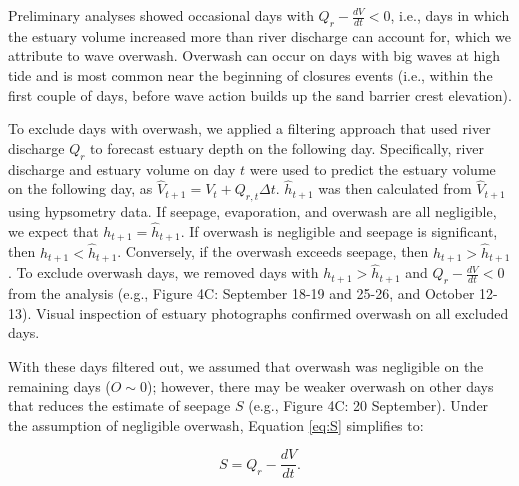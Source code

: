 \documentclass[preprint,12pt,authoryear]{elsarticle}
\begin{document}
Preliminary analyses showed occasional days with  $Q_r - \frac{dV}{ dt} <0$, i.e., days in which the estuary volume increased more than river discharge can account for, which we attribute to wave overwash. Overwash can occur on days with big waves at high tide and is most common near the beginning of closures events (i.e., within the first couple of days, before wave action builds up the sand barrier crest elevation).

To exclude days with overwash, we applied a filtering approach that used river discharge $Q_r$ to forecast estuary depth on the following day. 
Specifically, river discharge and  estuary volume  on day $t$ were used to predict the estuary volume on the following day,  as $\hat V_{t+1} = V_{t} + Q_{r,t} \Delta t$.    $\hat h_{t+1}$  was then calculated from $\hat V_{t+1}$ using hypsometry data.
If seepage, evaporation, and overwash are all negligible, we expect that $h_{t+1} = \hat h_{t+1}$. If overwash is negligible and seepage is significant, then $ h_{t+1} < \hat h_{t+1} $. Conversely, if  the overwash  exceeds seepage, then $h_{t+1} > \hat h_{t+1} $.  To exclude overwash days, we removed days with $h_{t+1} > \hat h_{t+1}$ and $Q_r - \frac{dV}{ dt} < 0$ from the analysis (e.g., Figure 4C: September 18-19 and 25-26, and October 12-13).
Visual inspection of estuary photographs confirmed overwash on all excluded days. 

 With these days filtered out, we assumed that overwash was negligible on the remaining days ($O \sim 0$); however, there may be weaker overwash on other days that reduces the estimate of seepage $S$ (e.g., Figure 4C: 20 September). Under the assumption of negligible overwash, Equation \ref{eq:S} simplifies to:

\begin{equation}
    S  = Q_r - \frac{dV}{ dt}.
\end{equation}


\end{document}
